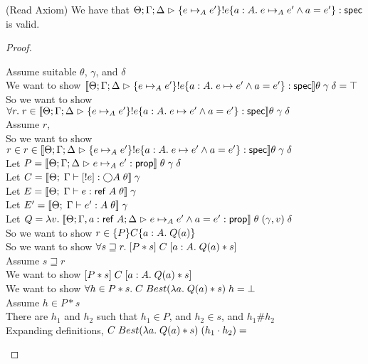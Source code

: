 \begin{lemma}{(Read Axiom)}
We have that $\judgeS{\spec{e \pointsto_A e'}{!e}{a:A}{e \pointsto_A e' \land a = e'}}$ is valid.\end{lemma}
\begin{proof}
  \begin{tabbedproof}
    \oo Assume suitable $\theta$, $\gamma$, and $\delta$ \\
    \ooo We want to show $\interp{\judgeS{\spec{e \pointsto_A e'}{!e}{a:A}{e \pointsto e' \land a = e'}}}\theta\;\gamma\;\delta = \top$ \\
    \ooo So we want to show $\forall r.\; r \in \interp{\judgeS{\spec{e \pointsto_A e'}{!e}{a:A}{e \pointsto e' \land a = e'}}}\theta\;\gamma\;\delta$ \\
    \ooo Assume $r$, \\
    \oooo So we want to show $r \in r \in \interp{\judgeS{\spec{e \pointsto_A e'}{!e}{a:A}{e \pointsto e' \land a = e'}}}\theta\;\gamma\;\delta$ \\
    \oooo Let $P = \interp{\judgeA{e \pointsto_A e'}{\assert}}\;\theta\;\gamma\;\delta$ \\
    \oooo Let $C = \interp{\judgeE{\Gamma}{\comp{!e}}{\monad{A}}\;\theta}\;\gamma$ \\
    \oooo Let $E = \interp{\judgeE{\Gamma}{e}{\reftype{A}}\;\theta}\;\gamma$ \\
    \oooo Let $E' = \interp{\judgeE{\Gamma}{e'}{A}\;\theta}\;\gamma$ \\
    \oooo Let $Q = \semfun{v}{\interp{\judgeA[\Theta; \Gamma, a:\reftype{A}; \Delta]{e \pointsto_A e' \land a = e'}{\assert}}\;\theta\;(\gamma, v)\;\delta}$ \\
    \oooo So we want to show $r \in \spec{P}{C}{a:A}{Q(a)}$ \\
    \oooo So we want to show $\forall s \sqsupseteq r.\; \basicspec{P*s}{C}{a:A}{Q(a)*s}$ \\
    \oooo Assume $s \sqsupseteq r$ \\
    \ooooo We want to show $\basicspec{P*s}{C}{a:A}{Q(a)*s}$ \\
    \ooooo We want to show $\forall h \in P*s.\; C\;Best(\semfun{a}{Q(a)*s})\;h = \bot$ \\
    \ooooo Assume $h \in P*s$ \\
    \oooooo There are $h_1$ and $h_2$ such that $h_1 \in P$, and $h_2 \in s$, and $h_1 \# h_2$ \\
    \oooooo Expanding definitions, $C\;Best(\semfun{a}{Q(a)*s})\;(h_1 \cdot h_2) = $ \\

\end{tabbedproof}
\end{proof}
